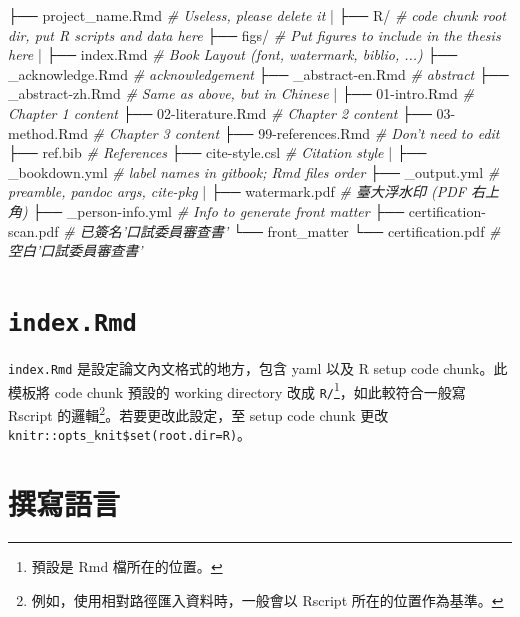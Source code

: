 \documentclass[oneside]{book}
\newenvironment{Shaded}{\begin{snugshade}}{\end{snugshade}}
\newcommand{\CommentTok}[1]{\textcolor[rgb]{0.56,0.35,0.01}{\textit{#1}}}
\newcommand{\NormalTok}[1]{#1}
\theoremstyle{definition}
\theoremstyle{definition}
\theoremstyle{definition}
\theoremstyle{remark}
\begin{document}
\begin{Shaded}
\begin{Highlighting}[]
\NormalTok{├── project_name.Rmd     }\CommentTok{# Useless, please delete it}
\NormalTok{|}
\NormalTok{├── R/                   }\CommentTok{# code chunk root dir, put R scripts and data here}
\NormalTok{├── figs/                }\CommentTok{# Put figures to include in the thesis here}
\NormalTok{|}
\NormalTok{├── index.Rmd            }\CommentTok{# Book Layout (font, watermark, biblio, ...)}
\NormalTok{├── _acknowledge.Rmd     }\CommentTok{# acknowledgement}
\NormalTok{├── _abstract-en.Rmd     }\CommentTok{# abstract}
\NormalTok{├── _abstract-zh.Rmd     }\CommentTok{# Same as above, but in Chinese}
\NormalTok{|}
\NormalTok{├── 01-intro.Rmd         }\CommentTok{# Chapter 1 content}
\NormalTok{├── 02-literature.Rmd    }\CommentTok{# Chapter 2 content}
\NormalTok{├── 03-method.Rmd        }\CommentTok{# Chapter 3 content}
\NormalTok{├── 99-references.Rmd    }\CommentTok{# Don't need to edit}
\NormalTok{├── ref.bib              }\CommentTok{# References}
\NormalTok{├── cite-style.csl       }\CommentTok{# Citation style}
\NormalTok{|}
\NormalTok{├── _bookdown.yml        }\CommentTok{# label names in gitbook; Rmd files order}
\NormalTok{├── _output.yml          }\CommentTok{# preamble, pandoc args, cite-pkg}
\NormalTok{|}
\NormalTok{├── watermark.pdf        }\CommentTok{# 臺大浮水印 (PDF 右上角)}
\NormalTok{├── _person-info.yml      }\CommentTok{# Info to generate front matter}
\NormalTok{├── certification-scan.pdf  }\CommentTok{# 已簽名'口試委員審查書'}
\NormalTok{└── front_matter}
\NormalTok{    └── certification.pdf   }\CommentTok{# 空白'口試委員審查書'}
\end{Highlighting}
\end{Shaded}

\section{\texorpdfstring{\texttt{index.Rmd}}{index.Rmd}}\label{index-rmd}

\texttt{index.Rmd} 是設定論文內文格式的地方，包含 yaml 以及 R setup code
chunk。此模板將 code chunk 預設的 working directory 改成
\texttt{R/}\footnote{預設是 Rmd 檔所在的位置。}，如此較符合一般寫
Rscript 的邏輯\footnote{例如，使用相對路徑匯入資料時，一般會以 Rscript
  所在的位置作為基準。}。若要更改此設定，至 setup code chunk 更改
\texttt{knitr::opts\_knit\$set(root.dir=\textquotesingle{}R\textquotesingle{})}。

\section{撰寫語言}\label{write-lang}
\end{document}
